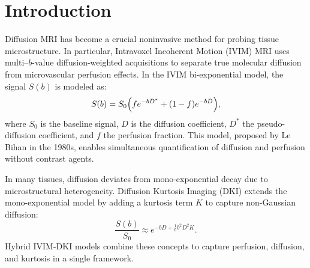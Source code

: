 \documentclass[a4paper,12pt]{article}
\begin{document}
\clearpage
\begin{abstract}
This report presents the outcomes of my remote summer internship at the Centre for Biomedical Engineering, IIT Delhi, focused on advanced quantitative MRI analysis. The primary objective was to implement and evaluate voxel-wise bi-exponential (IVIM) and hybrid IVIM-DKI models for diffusion-weighted imaging, with an emphasis on robust parameter estimation using Total Variation (TV) regularization. I gained proficiency in handling MRI data formats (DICOM/NIfTI), ROI selection using MRIcron, and image processing with Python libraries such as NiBabel and SimpleITK. Through simulations and real patient data, I developed and applied nonlinear least-squares fitting routines (\texttt{scipy.optimize.curve\_fit}, \texttt{lmfit}) and compared standard and TV-regularized approaches. Quantitative assessments—including RMSE, bias, and AIC—demonstrated that TV regularization substantially improves the consistency and reliability of parameter maps, especially under low SNR conditions. This work provided comprehensive exposure to the end-to-end workflow of quantitative MRI analysis, from data preprocessing and model implementation to statistical evaluation, and highlighted the clinical potential of advanced regularization techniques in diffusion MRI.
\end{abstract}

\clearpage
\section{Introduction}
Diffusion MRI has become a crucial noninvasive method for probing tissue microstructure. In particular, Intravoxel Incoherent Motion (IVIM) MRI uses multi--$b$-value diffusion-weighted acquisitions to separate true molecular diffusion from microvascular perfusion effects. In the IVIM bi-exponential model, the signal $S(b)$ is modeled as:
\begin{equation}
    S(b) = S_{0}\Bigl(f e^{-bD^{*}} + (1 - f)e^{-bD}\Bigr),
\end{equation}
where $S_{0}$ is the baseline signal, $D$ is the diffusion coefficient, $D^{*}$ the pseudo-diffusion coefficient, and $f$ the perfusion fraction. This model, proposed by Le Bihan in the 1980s, enables simultaneous quantification of diffusion and perfusion without contrast agents.

In many tissues, diffusion deviates from mono-exponential decay due to microstructural heterogeneity. Diffusion Kurtosis Imaging (DKI) extends the mono-exponential model by adding a kurtosis term $K$ to capture non-Gaussian diffusion:
\begin{equation}
    \frac{S(b)}{S_{0}} \approx e^{-bD + \tfrac{1}{6}b^{2}D^{2}K}.
\end{equation}
Hybrid IVIM-DKI models combine these concepts to capture perfusion, diffusion, and kurtosis in a single framework.
\end{document}
